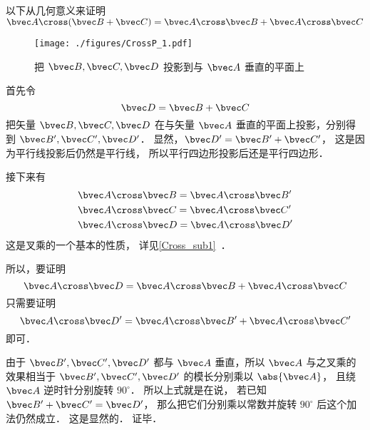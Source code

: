 
以下从几何意义来证明 $\bvec A \cross (\bvec B + \bvec C) = \bvec A \cross \bvec B + \bvec A \cross \bvec C$ 

\begin{figure}[ht]
\vskip-10pt
\centering
\texttt{[image: ./figures/CrossP\_1.pdf]}
\caption{把 $\bvec B,\bvec C,\bvec D$ 投影到与 $\bvec A$ 垂直的平面上}
\end{figure}

首先令
\begin{equation}
\bvec D = \bvec B + \bvec C
\end{equation}
把矢量 $\bvec B,\bvec C,\bvec D$ 在与矢量 $\bvec A$ 垂直的平面上投影，分别得到 $\bvec B',\bvec C',\bvec D'$． 显然，$\bvec D'=\bvec B'+\bvec C'$， 这是因为平行线投影后仍然是平行线， 所以平行四边形投影后还是平行四边形．

接下来有
\begin{equation}
\begin{aligned}
&\bvec A \cross \bvec B = \bvec A \cross \bvec B'\\
&\bvec A \cross \bvec C = \bvec A \cross \bvec C'\\
&\bvec A \cross \bvec D = \bvec A \cross \bvec D'
\end{aligned}
\end{equation} 
这是叉乘的一个基本的性质， 详见\autoref{Cross_sub1}~．

所以，要证明
\begin{equation}
\bvec A \cross \bvec D = \bvec A \cross \bvec B + \bvec A \cross \bvec C
\end{equation}
只需要证明
\begin{equation}
\bvec A \cross \bvec D' = \bvec A \cross \bvec B' + \bvec A \cross \bvec C'
\end{equation}
即可．

由于 $\bvec B', \bvec C', \bvec D'$ 都与 $\bvec A$ 垂直，所以 $\bvec A$ 与之叉乘的效果相当于 $\bvec B', \bvec C', \bvec D'$ 的模长分别乘以 $\abs {\bvec A}$， 且绕 $\bvec A$ 逆时针分别旋转 $90^\circ$． 所以上式就是在说， 若已知 $\bvec B' + \bvec C' = \bvec D'$， 那么把它们分别乘以常数并旋转 $90^\circ$ 后这个加法仍然成立． 这是显然的． 证毕．
